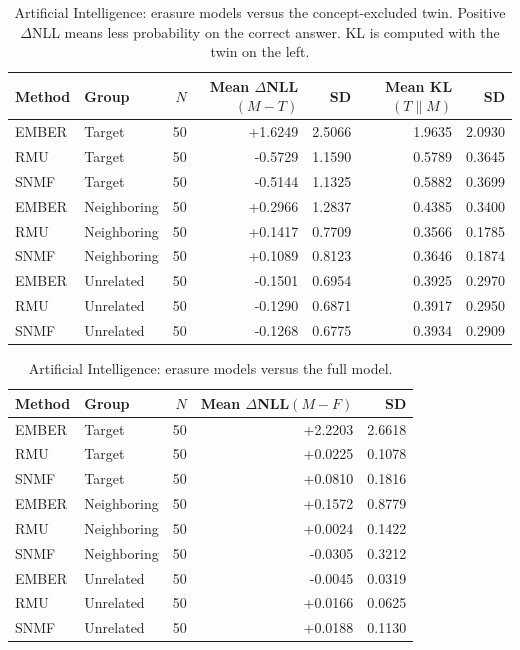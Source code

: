 \begin{table}[t]
\centering
\small
\begin{tabular}{llrrrrr}
\toprule
Method & Group & $N$ & Mean $\Delta$NLL$(M{-}T)$ & SD & Mean KL$(T\|M)$ & SD \\
\midrule
EMBER & Target & 50 & +1.6249 & 2.5066 & 1.9635 & 2.0930 \\
RMU & Target & 50 & -0.5729 & 1.1590 & 0.5789 & 0.3645 \\
SNMF & Target & 50 & -0.5144 & 1.1325 & 0.5882 & 0.3699 \\
EMBER & Neighboring & 50 & +0.2966 & 1.2837 & 0.4385 & 0.3400 \\
RMU & Neighboring & 50 & +0.1417 & 0.7709 & 0.3566 & 0.1785 \\
SNMF & Neighboring & 50 & +0.1089 & 0.8123 & 0.3646 & 0.1874 \\
EMBER & Unrelated & 50 & -0.1501 & 0.6954 & 0.3925 & 0.2970 \\
RMU & Unrelated & 50 & -0.1290 & 0.6871 & 0.3917 & 0.2950 \\
SNMF & Unrelated & 50 & -0.1268 & 0.6775 & 0.3934 & 0.2909 \\
\bottomrule
\end{tabular}
\caption{Artificial Intelligence: erasure models versus the concept-excluded twin. Positive $\Delta$NLL means less probability on the correct answer. KL is computed with the twin on the left.}
\label{tab:ai-vs-twin}
\end{table}

\begin{table}[t]
\centering
\small
\begin{tabular}{llrrr}
\toprule
Method & Group & $N$ & Mean $\Delta$NLL$(M{-}F)$ & SD \\
\midrule
EMBER & Target & 50 & +2.2203 & 2.6618 \\
RMU & Target & 50 & +0.0225 & 0.1078 \\
SNMF & Target & 50 & +0.0810 & 0.1816 \\
EMBER & Neighboring & 50 & +0.1572 & 0.8779 \\
RMU & Neighboring & 50 & +0.0024 & 0.1422 \\
SNMF & Neighboring & 50 & -0.0305 & 0.3212 \\
EMBER & Unrelated & 50 & -0.0045 & 0.0319 \\
RMU & Unrelated & 50 & +0.0166 & 0.0625 \\
SNMF & Unrelated & 50 & +0.0188 & 0.1130 \\
\bottomrule
\end{tabular}
\caption{Artificial Intelligence: erasure models versus the full model.}
\label{tab:ai-vs-full}
\end{table}

